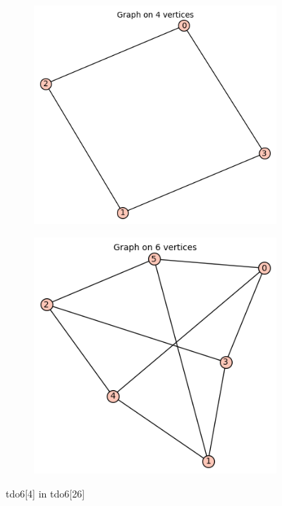 \documentclass[12pt, a4paper]{article}
\begin{document}
\begin{center}
\begin{figure}[!htb]
\centering
\begin{subfigure}{0.5\textwidth}
  \centering
  \includegraphics[width=0.5\linewidth]{tdo6[4]}
\end{subfigure}%
\begin{subfigure}{0.5\textwidth}
  \centering
  \includegraphics[width=0.5\linewidth]{tdo6[26]}
\end{subfigure}
\caption{tdo6[4] in tdo6[26]}
\label{fig:test}
\end{figure}


\end{center}
\end{document}
